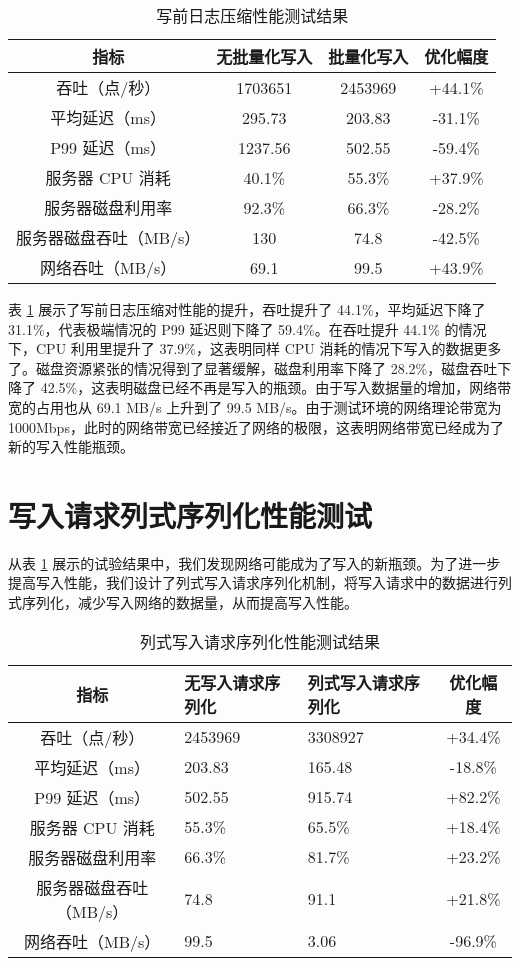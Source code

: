 \begin{table}
  \centering
  \caption{写前日志压缩性能测试结果}
  \begin{tabular}{cccc}
    \toprule 
    指标 & 无批量化写入 & 批量化写入 & 优化幅度 \\
    \midrule
    吞吐（点/秒） & 1703651 & 2453969 & +44.1\%\\
    平均延迟（ms） & 295.73 & 203.83 & -31.1\%\\
    P99 延迟（ms） & 1237.56 & 502.55& -59.4\% \\
    服务器 CPU 消耗 & 40.1\% & 	55.3\% & +37.9\%\\
    服务器磁盘利用率 & 92.3\% & 	66.3\% & -28.2\%\\
    服务器磁盘吞吐（MB/s） & 130 & 	74.8 & -42.5\% \\
    网络吞吐（MB/s） & 69.1 & 	99.5 & +43.9\%\\
    \bottomrule 
  \end{tabular}
  \label{tabular:wal-compression-performance}
\end{table}

表 \ref{tabular:wal-compression-performance} 展示了写前日志压缩对性能的提升，吞吐提升了 44.1\%，平均延迟下降了 31.1\%，代表极端情况的 P99 延迟则下降了 59.4\%。在吞吐提升 44.1\% 的情况下，CPU 利用里提升了 37.9\%，这表明同样 CPU 消耗的情况下写入的数据更多了。磁盘资源紧张的情况得到了显著缓解，磁盘利用率下降了 28.2\%，磁盘吞吐下降了 42.5\%，这表明磁盘已经不再是写入的瓶颈。由于写入数据量的增加，网络带宽的占用也从 69.1 MB/s 上升到了 99.5 MB/s。由于测试环境的网络理论带宽为 1000Mbps，此时的网络带宽已经接近了网络的极限，这表明网络带宽已经成为了新的写入性能瓶颈。


\section{写入请求列式序列化性能测试}
从表 \ref{tabular:wal-compression-performance} 展示的试验结果中，我们发现网络可能成为了写入的新瓶颈。为了进一步提高写入性能，我们设计了列式写入请求序列化机制，将写入请求中的数据进行列式序列化，减少写入网络的数据量，从而提高写入性能。

\begin{table}
  \centering
  \caption{列式写入请求序列化性能测试结果}
  \begin{tabular}{cp{3.5cm}p{3.5cm}c}
    \toprule 
    指标 &  无写入请求序列化 & 列式写入请求序列化 & 优化幅度 \\
    \midrule  
    吞吐（点/秒） & 2453969 & 3308927 & +34.4\%\\  
    平均延迟（ms） & 203.83 & 165.48 & -18.8\%\\  
    P99 延迟（ms） & 502.55 & 915.74 & +82.2\%\\  
    服务器 CPU 消耗 & 55.3\% & 65.5\% & +18.4\%\\  
    服务器磁盘利用率 & 66.3\% & 81.7\% & +23.2\%\\  
    服务器磁盘吞吐（MB/s） & 74.8 & 91.1 & +21.8\%\\  
    网络吞吐（MB/s） & 99.5 & 3.06 & -96.9\%\\  
    \bottomrule 
  \end{tabular}
  \label{tabular:columnar-serialization-performance}
\end{table}

